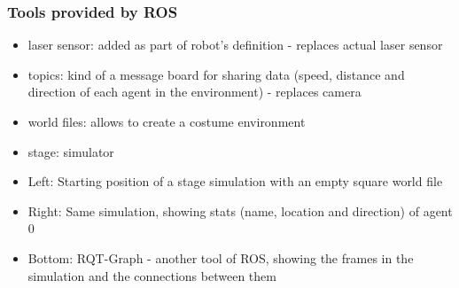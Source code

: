 \documentclass[a0,portrait]{a0poster}
\begin{document}
\begin{multicols}{2}
  \subsubsection*{Tools provided by ROS}
  \begin{itemize}
  \item laser sensor: added as part of robot's definition - replaces actual laser sensor
  \item topics: kind of a message board for sharing data (speed, distance and direction of each agent in the environment) - replaces camera
  \item world files: allows to create a costume environment
  \item stage: simulator
  \end{itemize}


  \begin{itemize}
  \item Left: Starting position of a stage simulation with an empty square world file
  \item Right: Same simulation, showing stats (name, location and direction) of agent 0
  \item Bottom: RQT-Graph - another tool of ROS, showing the frames in the simulation and the connections between them
  \end{itemize}





\end{multicols}
\end{document}
